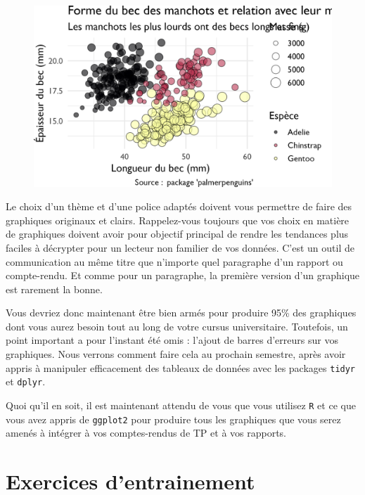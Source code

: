 \documentclass[
  letterpaper,
  DIV=11,
  numbers=noendperiod]{scrreprt}
\begin{document}
\begin{figure}[H]

{\centering \includegraphics{./03-visualization_files/figure-pdf/unnamed-chunk-112-1.png}

}

\end{figure}

Le choix d'un thème et d'une police adaptés doivent vous permettre de
faire des graphiques originaux et clairs. Rappelez-vous toujours que vos
choix en matière de graphiques doivent avoir pour objectif principal de
rendre les tendances plus faciles à décrypter pour un lecteur non
familier de vos données. C'est un outil de communication au même titre
que n'importe quel paragraphe d'un rapport ou compte-rendu. Et comme
pour un paragraphe, la première version d'un graphique est rarement la
bonne.

Vous devriez donc maintenant être bien armés pour produire 95\% des
graphiques dont vous aurez besoin tout au long de votre cursus
universitaire. Toutefois, un point important a pour l'instant été omis :
l'ajout de barres d'erreurs sur vos graphiques. Nous verrons comment
faire cela au prochain semestre, après avoir appris à manipuler
efficacement des tableaux de données avec les packages \texttt{tidyr} et
\texttt{dplyr}.

Quoi qu'il en soit, il est maintenant attendu de vous que vous utilisez
\texttt{R} et ce que vous avez appris de \texttt{ggplot2} pour produire
tous les graphiques que vous serez amenés à intégrer à vos
comptes-rendus de TP et à vos rapports.

\hypertarget{exercices-dentrainement}{%
\section{Exercices d'entrainement}\label{exercices-dentrainement}}
\end{document}
